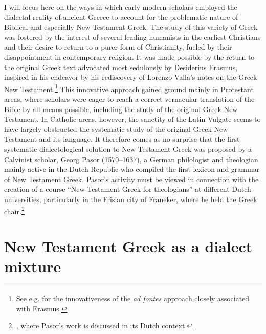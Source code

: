 I will focus here on the ways in which early modern scholars employed the dialectal reality of ancient Greece to account for the problematic nature of Biblical and especially New Testament Greek. The study of this variety of Greek was fostered by the interest of several leading humanists in the earliest Christians and their desire to return to a purer form of Christianity, fueled by their disappointment in contemporary religion. It was made possible by the return to the original Greek text advocated most sedulously by Desiderius Erasmus, inspired in his endeavor by his rediscovery of Lorenzo Valla’s notes on the Greek New Testament.\footnote{See e.g. \citet[esp. 31]{Bentley1983} for the innovativeness of the \textit{ad fontes} approach closely associated with Erasmus.} This innovative approach gained ground mainly in Protestant areas, where scholars were eager to reach a correct vernacular translation of the Bible by all means possible, including the study of the original Greek New Testament. In Catholic areas, however, the sanctity of the Latin Vulgate seems to have largely obstructed the systematic study of the original Greek New Testament and its language. It therefore comes as no surprise that the first systematic dialectological solution to New Testament Greek was proposed by a Calvinist scholar, Georg Pasor (1570–1637), a German philologist and theologian mainly active in the Dutch Republic who compiled the first lexicon and grammar of New Testament Greek. Pasor’s activity must be viewed in connection with the creation of a course “New Testament Greek for theologians” at different Dutch universities, particularly in the Frisian city of Franeker, where he held the Greek chair.\footnote{\citet[29-31]{De1980}, where Pasor’s work is discussed in its Dutch context.}

\section{New Testament Greek as a dialect mixture}\label{sec:4.5}

